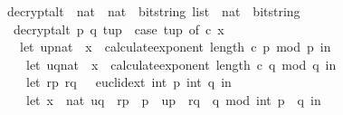 \begin{isabellebody}
\isanewline
{}\isamarkupfalse%
\ decrypt{\isacharunderscore}{\kern0pt}alt\ {\isacharcolon}{\kern0pt}{\isacharcolon}{\kern0pt}\ {\isachardoublequoteopen}nat\ {\isasymRightarrow}\ nat\ {\isasymRightarrow}\ {\isacharparenleft}{\kern0pt}bitstring\ list\ {\isasymtimes}\ nat{\isacharparenright}{\kern0pt}\ {\isasymRightarrow}\ bitstring{\isachardoublequoteclose}\ \isanewline
\ \ {\isachardoublequoteopen}decrypt{\isacharunderscore}{\kern0pt}alt\ p\ q\ tup\ {\isacharequal}{\kern0pt}\ {\isacharparenleft}{\kern0pt}case\ tup\ of\ {\isacharparenleft}{\kern0pt}c{\isacharcomma}{\kern0pt}\ x{\isacharparenright}{\kern0pt}\ {\isasymRightarrow}\ \isanewline
\ \ \ {\isacharparenleft}{\kern0pt}let\ {\isacharparenleft}{\kern0pt}u{\isacharunderscore}{\kern0pt}p{\isacharcolon}{\kern0pt}{\isacharcolon}{\kern0pt}nat{\isacharparenright}{\kern0pt}\ {\isacharequal}{\kern0pt}\ x\ {\isacharcircum}{\kern0pt}\ {\isacharparenleft}{\kern0pt}calculate{\isacharunderscore}{\kern0pt}exponent\ {\isacharparenleft}{\kern0pt}length\ c{\isacharparenright}{\kern0pt}\ p{\isacharparenright}{\kern0pt}\ mod\ p\ in\isanewline
\ \ \ \ let\ {\isacharparenleft}{\kern0pt}u{\isacharunderscore}{\kern0pt}q{\isacharcolon}{\kern0pt}{\isacharcolon}{\kern0pt}nat{\isacharparenright}{\kern0pt}\ {\isacharequal}{\kern0pt}\ x\ {\isacharcircum}{\kern0pt}\ {\isacharparenleft}{\kern0pt}calculate{\isacharunderscore}{\kern0pt}exponent\ {\isacharparenleft}{\kern0pt}length\ c{\isacharparenright}{\kern0pt}\ q{\isacharparenright}{\kern0pt}\ mod\ q\ in\isanewline
\ \ \ \ let\ {\isacharparenleft}{\kern0pt}{\isacharparenleft}{\kern0pt}r{\isacharunderscore}{\kern0pt}p{\isacharcomma}{\kern0pt}\ r{\isacharunderscore}{\kern0pt}q{\isacharparenright}{\kern0pt}{\isacharcomma}{\kern0pt}\ {\isacharunderscore}{\kern0pt}{\isacharparenright}{\kern0pt}\ {\isacharequal}{\kern0pt}\ euclid{\isacharunderscore}{\kern0pt}ext\ {\isacharparenleft}{\kern0pt}int\ p{\isacharparenright}{\kern0pt}\ {\isacharparenleft}{\kern0pt}int\ q{\isacharparenright}{\kern0pt}\ in\isanewline
\ \ \ \ let\ x{\isacharunderscore}{\kern0pt}{}\ {\isacharequal}{\kern0pt}\ nat\ {\isacharparenleft}{\kern0pt}{\isacharparenleft}{\kern0pt}u{\isacharunderscore}{\kern0pt}q\ {\isacharasterisk}{\kern0pt}\ r{\isacharunderscore}{\kern0pt}p\ {\isacharasterisk}{\kern0pt}\ p\ {\isacharplus}{\kern0pt}\ u{\isacharunderscore}{\kern0pt}p\ {\isacharasterisk}{\kern0pt}\ r{\isacharunderscore}{\kern0pt}q\ {\isacharasterisk}{\kern0pt}\ q{\isacharparenright}{\kern0pt}\ mod\ int\ {\isacharparenleft}{\kern0pt}p\ {\isacharasterisk}{\kern0pt}\ q{\isacharparenright}{\kern0pt}{\isacharparenright}{\kern0pt}\ in\isanewline

\end{isabellebody}
